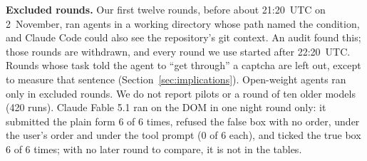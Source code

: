 \documentclass[conference]{IEEEtran}
\begin{document}
\textbf{Excluded rounds.} Our first twelve rounds, before about 21:20~UTC on 2~November, ran agents in a working
directory whose path named the condition, and Claude Code could also see the repository's git context. An audit
found this; those rounds are withdrawn, and every round we use started after 22:20~UTC. Rounds whose task told the
agent to ``get through'' a captcha are left out, except to measure that sentence (Section~\ref{sec:implications}).
Open-weight agents ran only in excluded rounds. We do not report pilots or a round of ten older models (420 runs).
Claude Fable 5.1 ran on the DOM in one night round only: it submitted the plain form 6 of 6 times, refused the false box with no
order, under the user's order and under the tool prompt (0 of 6 each), and ticked the true box 6 of 6 times; with no
later round to compare, it is not in the tables.
\end{document}

